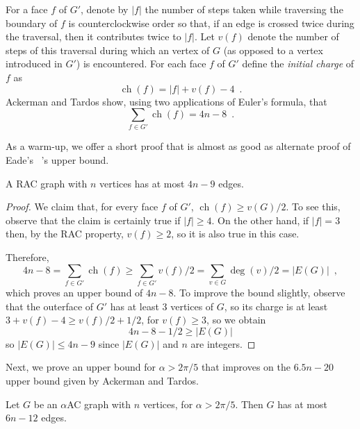 \documentclass[lotsofwhite,charterfonts]{patmorin}
\DeclareMathOperator{\ch}{ch}
\begin{document}
For a face $f$ of $G'$, denote by $|f|$ the number of steps taken while
traversing the boundary of $f$ is counterclockwise order so that, if an
edge is crossed twice during the traversal, then it contributes twice to
$|f|$.  Let $v(f)$ denote the number of steps of this traversal during
which an vertex of $G$ (as opposed to a vertex introduced in $G'$) is
encountered.  For each face $f$ of $G'$ define the \emph{initial charge} of
$f$ as
\[
    \ch(f) = |f| + v(f) - 4  \enspace .
\]
Ackerman and Tardos show, using two applications of Euler's formula, that
\[
    \sum_{f\in G'} \ch(f) = 4n-8 \enspace .
\]

As a warm-up, we offer a short proof that is almost as good as 
alternate proof of Eade's \etal\ 's upper bound.

\begin{thm}
A RAC graph with $n$ vertices has at most $4n-9$ edges.
\end{thm}

\begin{proof}
We claim that, for every face $f$ of $G'$, $\ch(f)\ge v(G)/2$.  To see
this, observe that the claim is certainly true if $|f| \ge 4$.  On the
other hand, if $|f|=3$ then, by the RAC property, $v(f) \ge 2$, so it is
also true in this case.

Therefore,
\[
 4n-8 = \sum_{f\in G'} \ch(f) \ge
 \sum_{f\in G'} v(f)/2 = \sum_{v\in G} \deg(v)/2 = |E(G)| \enspace ,
\]
which proves an upper bound of $4n-8$.  To improve the bound slightly,
observe that the outerface of $G'$ has at least 3 vertices of $G$, so its
charge is at least $3+v(f)-4 \ge v(f)/2+1/2$, for $v(f)\ge 3$, so we obtain
\[
4n-8-1/2 \ge |E(G)|
\]
so $|E(G)| \le 4n-9$ since $|E(G)|$ and $n$ are integers.
\end{proof}


Next, we prove an upper bound for $\alpha > 2\pi/5$ that improves on the
$6.5n-20$ upper bound given by Ackerman and Tardos.

\begin{thm}
Let $G$ be an $\alpha$AC graph with $n$ vertices, for $\alpha > 2\pi/5$.
Then $G$ has at most $6n-12$ edges.
\end{thm}
\end{document}
